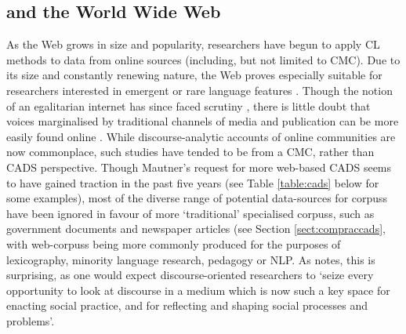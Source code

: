 \subsection{ and the World Wide Web} \label{sect:webcorp}



As the Web grows in size and popularity, researchers have begun to apply \gls{CL} methods to data from online sources (including, but not limited to \gls{CMC}). Due to its size and constantly renewing nature, the Web proves especially suitable for researchers interested in emergent or rare language features \cite{fletcher_corpus_2012,koteyko_mining_2010}. Though the notion of an egalitarian internet has since faced scrutiny \cite[see][]{boyd_critical_2012,herring_computer-mediated_1996}, there is little doubt that voices marginalised by traditional channels of media and publication can be more easily found online \cite{chiluwa_social_2012,ryder_affordances_1996}. While discourse\hyp{}analytic accounts of online communities are now commonplace, such studies have tended to be from a \gls{CMC}, rather than \gls{CADS} perspective. Though Mautner's \cite*{mautner_time_2005} request for more web\hyp{}based \gls{CADS} seems to have gained traction in the past five years (see Table \ref{table:cads} below for some examples), most of the diverse range of potential data\hyp{}sources for \glspl{corpus} have been ignored in favour of more `traditional' specialised \glspl{corpus}, such as government documents and newspaper articles (see Section \ref{sect:compraccads}, with web\hyp{}\glspl{corpus} being more commonly produced for the purposes of lexicography, minority language research, pedagogy or \gls{NLP}. As \textcite[p.~810]{mautner_time_2005} notes, this is surprising, as one would expect discourse\hyp{}oriented researchers to `seize every opportunity to look at discourse in a medium which is now such a key space for enacting social practice, and for reflecting and shaping social processes and problems'.

